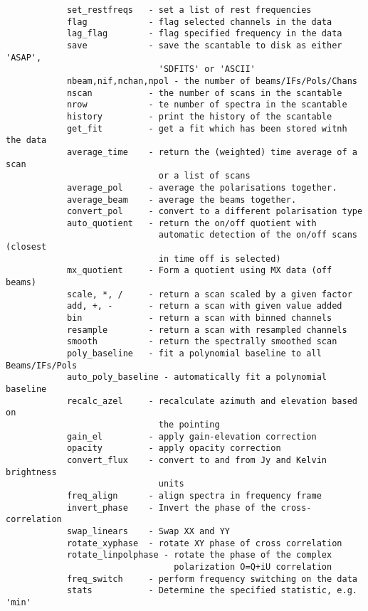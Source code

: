 \documentclass[11pt]{article}
\begin{document}
\begin{verbatim}
            set_restfreqs   - set a list of rest frequencies
            flag            - flag selected channels in the data
            lag_flag        - flag specified frequency in the data
            save            - save the scantable to disk as either 'ASAP',
                              'SDFITS' or 'ASCII'
            nbeam,nif,nchan,npol - the number of beams/IFs/Pols/Chans
            nscan           - the number of scans in the scantable
            nrow            - te number of spectra in the scantable
            history         - print the history of the scantable
            get_fit         - get a fit which has been stored witnh the data
            average_time    - return the (weighted) time average of a scan
                              or a list of scans
            average_pol     - average the polarisations together.
            average_beam    - average the beams together.
            convert_pol     - convert to a different polarisation type
            auto_quotient   - return the on/off quotient with
                              automatic detection of the on/off scans (closest
                              in time off is selected)
            mx_quotient     - Form a quotient using MX data (off beams)
            scale, *, /     - return a scan scaled by a given factor
            add, +, -       - return a scan with given value added
            bin             - return a scan with binned channels
            resample        - return a scan with resampled channels
            smooth          - return the spectrally smoothed scan
            poly_baseline   - fit a polynomial baseline to all Beams/IFs/Pols
            auto_poly_baseline - automatically fit a polynomial baseline
            recalc_azel     - recalculate azimuth and elevation based on
                              the pointing
            gain_el         - apply gain-elevation correction
            opacity         - apply opacity correction
            convert_flux    - convert to and from Jy and Kelvin brightness
                              units
            freq_align      - align spectra in frequency frame
            invert_phase    - Invert the phase of the cross-correlation
            swap_linears    - Swap XX and YY
            rotate_xyphase  - rotate XY phase of cross correlation
            rotate_linpolphase - rotate the phase of the complex
                                 polarization O=Q+iU correlation
            freq_switch     - perform frequency switching on the data
            stats           - Determine the specified statistic, e.g. 'min'

\end{verbatim}
\end{document}
